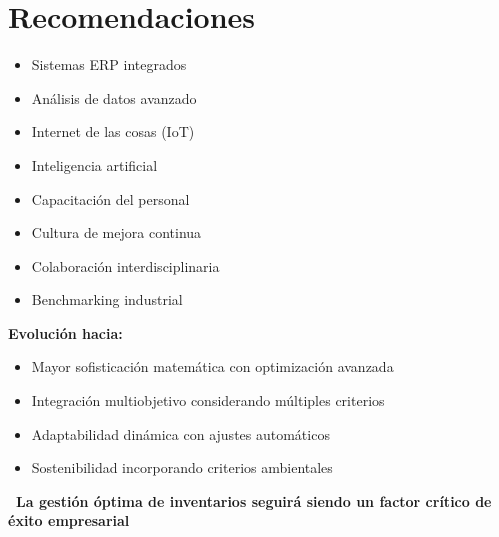 \documentclass[12pt,a4paper]{book}
\begin{document}
	\section{Recomendaciones}
	
	\begin{multicols}{2}
		\begin{tcolorbox}[colback=verdeclaro,colframe=verdeprincipal,boxrule=2pt,arc=8pt,
			title={\bfseries\color{white} \faLaptop\ TECNOLOGÍA}]
			\begin{itemize}[leftmargin=*,label=\textcolor{azulprincipal}{\faCheck}]
				\item Sistemas ERP integrados
				\item Análisis de datos avanzado  
				\item Internet de las cosas (IoT)
				\item Inteligencia artificial
			\end{itemize}
		\end{tcolorbox}
		
		\begin{tcolorbox}[colback=azulclaro,colframe=azulprincipal,boxrule=2pt,arc=8pt,
			title={\bfseries\color{white} \faUsers\ DESARROLLO}]
			\begin{itemize}[leftmargin=*,label=\textcolor{verdeprincipal}{\faCheck}]
				\item Capacitación del personal
				\item Cultura de mejora continua
				\item Colaboración interdisciplinaria
				\item Benchmarking industrial
			\end{itemize}
		\end{tcolorbox}
	\end{multicols}
	
	\begin{tcolorbox}[enhanced,colback=naranjaclaro,colframe=naranjaacento,boxrule=3pt,arc=12pt,
		drop shadow,title={\Large\bfseries\color{white} \faGlobe\ TENDENCIAS FUTURAS}]
		
		\textbf{Evolución hacia:}
		\begin{itemize}[leftmargin=*,label=\textcolor{azulprincipal}{\faArrowRight}]
			\item Mayor sofisticación matemática con optimización avanzada
			\item Integración multiobjetivo considerando múltiples criterios
			\item Adaptabilidad dinámica con ajustes automáticos
			\item Sostenibilidad incorporando criterios ambientales
		\end{itemize}
		
	\end{tcolorbox}
	
	\begin{center}
		\begin{tcolorbox}[enhanced,colback=moradoacento,colframe=white,boxrule=2pt,arc=10pt,
			width=0.8\textwidth,center]
			\centering
			{\Large\bfseries\color{white} \faTrophy\ La gestión óptima de inventarios seguirá siendo un factor crítico de éxito empresarial}
		\end{tcolorbox}
	\end{center}
	
\end{document}
